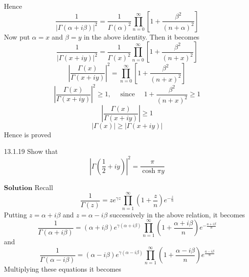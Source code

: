 Hence
$$
\frac{1}{|\Gamma(\alpha+i \beta)|^{2}}=\frac{1}{\Gamma(\alpha)^{2}} \prod_{n=0}^{\infty}\left[1+\frac{\beta^{2}}{(n+\alpha)^{2}}\right]
$$
Now put $\alpha=x$ and $\beta=y$ in the above identity. Then it becomes
$$
\frac{1}{|\Gamma(x+i y)|^{2}}=\frac{1}{\Gamma(x)^{2}} \prod_{n=0}^{\infty}\left[1+\frac{\beta^{2}}{(n+x)^{2}}\right]
$$
$$
\left|\frac{\Gamma(x)}{\Gamma(x+i y)}\right|^{2}=\prod_{n=0}^{\infty}\left[1+\frac{\beta^{2}}{(n+x)^{2}}\right]
$$
$$
\left|\frac{\Gamma(x)}{\Gamma(x+i y)}\right|^{2} \geq 1, \quad \text { since }\quad 1+\frac{\beta^{2}}{(n+x)^{2}} \geq 1
$$
$$\left|\frac{\Gamma(x)}{\Gamma(x+i y)}\right| \geq 1$$
$$|\Gamma(x)| \geq|\Gamma(x+i y)|$$
Hence is proved






\newpage

\begin{mybox}{13.1.19}
Show that 
$$\left|\Gamma(\frac{1}{2}+i y)\right|^{2}=\frac{\pi}{\cosh \pi y}$$
\end{mybox}


$\boxed{\textbf{Solution}}$ Recall 
$$
\frac{1}{\Gamma(z)}=z e^{\gamma z} \prod_{n=1}^{\infty}\left(1+\frac{z}{n}\right) e^{-\frac{z}{n}}
$$
Putting $z=\alpha+i \beta$ and $z=\alpha-i \beta$ successively in the above relation, it becomes
$$
\frac{1}{\Gamma(\alpha+i \beta)}=(\alpha+i \beta) e^{\gamma(\alpha+i \beta)} \prod_{n=1}^{\infty}\left(1+\frac{\alpha+i \beta}{n}\right) e^{-\frac{a+i \beta}{n}}
$$
and 
$$
\frac{1}{\Gamma(\alpha-i \beta)}=(\alpha-i \beta) e^{\gamma(\alpha-i \beta)} \prod_{n=1}^{\infty}\left(1+\frac{\alpha-i \beta}{n}\right) e^{\frac{a-i \beta}{n}}
$$
Multiplying these equations it becomes

